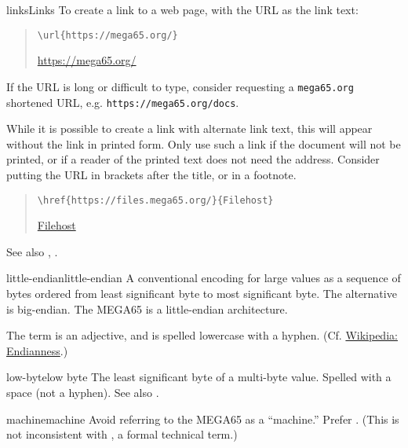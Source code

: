 \begin{sgentry}{links}{Links}
    To create a link to a web page, with the URL as the link text:

    \begin{quote}
        \texttt{{\textbackslash}url\{https://mega65.org/\}}

        \hrulefill

        \url{https://mega65.org/}
    \end{quote}

    If the URL is long or difficult to type, consider requesting a \texttt{mega65.org} shortened URL, e.g. \texttt{https://mega65.org/docs}.

    While it is possible to create a link with alternate link text, this will appear without the link in printed form. Only use such a link if the document will not be printed, or if a reader of the printed text does not need the address. Consider putting the URL in brackets after the title, or in a footnote.

    \begin{quote}
        \texttt{{\textbackslash}href\{https://files.mega65.org/\}\{Filehost\}}

        \hrulefill

        \href{https://files.mega65.org/}{Filehost}
    \end{quote}

    See also , .
\end{sgentry}

\begin{sgentry}{little-endian}{little-endian}
    A conventional encoding for large values as a sequence of bytes ordered from least significant byte to most significant byte. The alternative is big-endian. The MEGA65 is a little-endian architecture.

    The term is an adjective, and is spelled lowercase with a hyphen. (Cf. \href{https://en.wikipedia.org/wiki/Endianness}{Wikipedia: Endianness}.)
\end{sgentry}

\begin{sgentry}{low-byte}{low byte}
    The least significant byte of a multi-byte value. Spelled with a space (not a hyphen). See also .
\end{sgentry}

\begin{sgentry}{machine}{machine}
    Avoid referring to the MEGA65 as a ``machine.'' Prefer . (This is not inconsistent with , a formal technical term.)
\end{sgentry}

